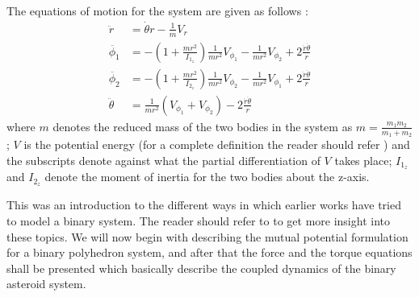 \FloatBarrier
%
The equations of motion for the system are given as follows \cite{chappaz}:
\begin{equation}
\begin{aligned}
\ddot{r} &= \dot{\theta} r - \frac{1}{m} V_r \\
\ddot{\phi_1} &= -\left(1 + \frac{mr^2}{I_{1_z}} \right) \frac{1}{mr^2} V_{\phi_1} - \frac{1}{mr^2} V_{\phi_2} + 2 \frac{\dot{r} \dot{\theta}}{r} \\
\ddot{\phi_2} &= -\left(1 + \frac{mr^2}{I_{2_z}} \right) \frac{1}{mr^2} V_{\phi_2} - \frac{1}{mr^2} V_{\phi_1} + 2 \frac{\dot{r} \dot{\theta}}{r} \\
\ddot{\theta} &= \frac{1}{mr^2}(V_{\phi_1} + V_{\phi_2}) - 2 \frac{\dot{r} \dot{\theta}}{r}
\end{aligned}
\end{equation}
%
where $m$ denotes the reduced mass of the two bodies in the system as $m = \frac{m_1 m_2}{m_1 + m_2}$; $V$ is the potential energy (for a complete definition the reader should refer \cite{chappaz}) and the subscripts denote against what the partial differentiation of $V$ takes place; $I_{1_z}$ and $I_{2_z}$ denote the moment of inertia for the two bodies about the z-axis.

This was an introduction to the different ways in which earlier works have tried to model a binary system. The reader should refer to \cite{chappaz} to get more insight into these topics. We will now begin with describing the mutual potential formulation for a binary polyhedron system, and after that the force and the torque equations shall be presented which basically describe the coupled dynamics of the binary asteroid system.

